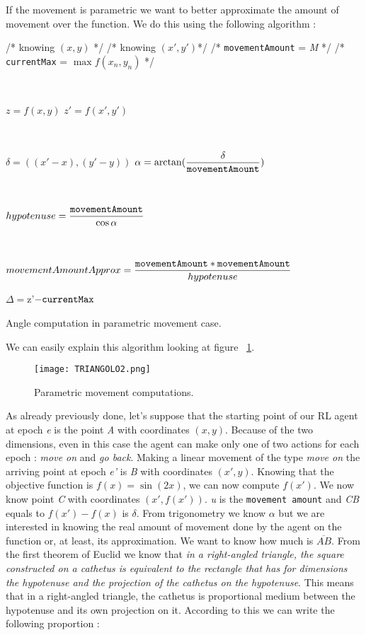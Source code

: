 If the movement is parametric we want to better approximate the amount of movement over the function. We do this using the following algorithm :

\begin{algorithm}
	/* knowing $(x, y)$ */ \;
	/* knowing $(x', y')$*/ \;
	/* {\tt movementAmount} = \textit{M} */ \;
	/* {\tt currentMax} = $\max f(x_n, y_n)$ */ \;
	
	
	\
	
	$z = f(x, y)$ \;
	$z' = f(x', y')$\;
	
	\
	
	$\delta = ((x'-x),  (y'-y))$ \;
	$\alpha = \arctan(\dfrac{\delta}{\tt movementAmount})$ \;
	
	\
	
	$hypotenuse = \dfrac{{\tt movementAmount}}{\cos \alpha}$ \;
	
	\
	
	$movementAmountApprox = \dfrac{{\tt movementAmount} * {\tt movementAmount}}{hypotenuse}$
	
	$\Delta = $z'$ - {\tt currentMax} $\;
	
	\caption{Angle computation in parametric movement case.} 
	\label{PMAlgo}
	
\end{algorithm}

We can easily explain this algorithm looking at figure ~\ref{fig:PMComputations}. 

\begin{figure} [h!]
	\centering
	\texttt{[image: TRIANGOLO2.png]}
	\caption{Parametric movement computations.}
	\label{fig:PMComputations}
\end{figure}

As already previously done, let's suppose that the starting point of our RL agent at epoch \textit{e} is the point \textit{A} with coordinates $(x, y)$. Because of the two dimensions, even in this case the agent can make only one of two actions for each epoch : \textit{move on} and \textit{go back}. Making a linear movement of the type \textit{move on} the arriving point at epoch \textit{e'} is \textit{B} with coordinates $(x', y)$. Knowing that the objective function is $f(x) = \sin(2x)$, we can now compute $f(x')$. We now know point \textit{C} with coordinates $(x', f(x'))$. \textit{u} is the {\tt movement amount} and \textit{CB} equals to $f(x') - f(x)$ is $\delta$. From trigonometry we know $\alpha$ but we are interested in knowing the real amount of movement done by the agent on the function or, at least, its approximation. We want to know how much is $\overline{AB}$.  From the first theorem of Euclid we know that \textit{in a right-angled triangle, the square constructed on a cathetus is equivalent to the rectangle that has for dimensions the hypotenuse and the projection of the cathetus on the hypotenuse}. This means that in a right-angled triangle, the cathetus is proportional medium between the hypotenuse and its own projection on it. According to this we can write the following proportion :

